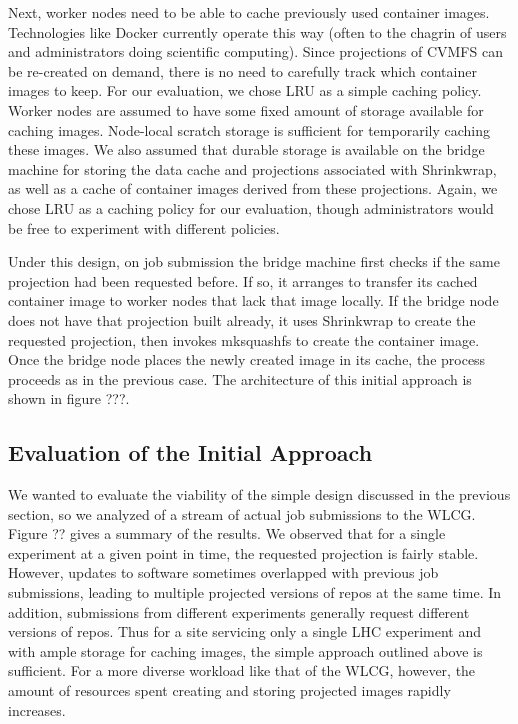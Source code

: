 \documentclass[conference]{IEEEtran}
\begin{document}
Next, worker nodes need to be able to cache previously used container images.
Technologies like Docker currently operate this way (often to the chagrin of users and administrators doing scientific computing).
Since projections of CVMFS can be re-created on demand,
there is no need to carefully track which container images to keep.
For our evaluation,
we chose LRU as a simple caching policy.
Worker nodes are assumed to have some fixed amount of storage available for caching images.
Node-local scratch storage is sufficient for temporarily caching these images.
We also assumed that durable storage is available on the bridge machine for storing the data cache and projections associated with Shrinkwrap,
as well as a cache of container images derived from these projections.
Again, we chose LRU as a caching policy for our evaluation,
though administrators would be free to experiment with different policies.

Under this design,
on job submission the bridge machine first checks if the same projection had been requested before.
If so, it arranges to transfer its cached container image to worker nodes that lack that image locally.
If the bridge node does not have that projection built already,
it uses Shrinkwrap to create the requested projection,
then invokes mksquashfs to create the container image.
Once the bridge node places the newly created image in its cache,
the process proceeds as in the previous case.
The architecture of this initial approach is shown in figure ???.

\subsection{Evaluation of the Initial Approach}

We wanted to evaluate the viability of the simple design discussed in the previous section,
so we analyzed of a stream of actual job submissions to the WLCG.
Figure ?? gives a summary of the results.
We observed that for a single experiment at a given point in time,
the requested projection is fairly stable.
However, updates to software sometimes overlapped with previous job submissions,
leading to multiple projected versions of repos at the same time.
In addition, submissions from different experiments generally request different versions of repos.
Thus for a site servicing only a single LHC experiment and with ample storage for caching images,
the simple approach outlined above is sufficient.
For a more diverse workload like that of the WLCG,
however, the amount of resources spent creating and storing projected images rapidly increases.
\end{document}
